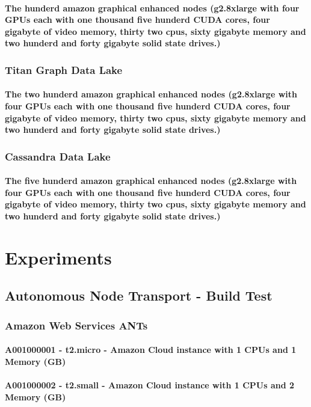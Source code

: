 \paragraph{The hunderd amazon graphical enhanced nodes (g2.8xlarge with four GPUs each with one thousand five hunderd CUDA cores, four gigabyte of video memory, thirty two cpus, sixty gigabyte memory and two hunderd and forty gigabyte solid state drives.)}
\subsubsection{Titan Graph Data Lake}
\paragraph{The two hunderd amazon graphical enhanced nodes (g2.8xlarge with four GPUs each with one thousand five hunderd CUDA cores, four gigabyte of video memory, thirty two cpus, sixty gigabyte memory and two hunderd and forty gigabyte solid state drives.)}\subsubsection{Cassandra Data Lake}
\paragraph{The five hunderd amazon graphical enhanced nodes (g2.8xlarge with four GPUs each with one thousand five hunderd CUDA cores, four gigabyte of video memory, thirty two cpus, sixty gigabyte memory and two hunderd and forty gigabyte solid state drives.)}
\pagebreak
\section{Experiments}
\subsection{Autonomous Node Transport - Build Test}
\subsubsection{Amazon Web Services ANTs}
\paragraph{A001000001 - t2.micro - Amazon Cloud instance with 1 CPUs and 1 Memory (GB)}
\paragraph{A001000002 - t2.small - Amazon Cloud instance with 1 CPUs and 2 Memory (GB)}

